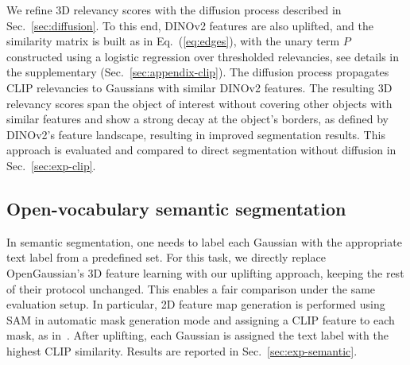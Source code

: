 We refine 3D relevancy scores with the diffusion process described in Sec.~\ref{sec:diffusion}. To this end, DINOv2 features are also uplifted, and the similarity matrix is built as in Eq.~(\ref{eq:edges}), with the unary term $P$ constructed using a logistic regression over thresholded relevancies, see details in the supplementary (Sec.~\ref{sec:appendix-clip}). The diffusion process propagates CLIP relevancies to Gaussians with similar DINOv2 features. The resulting 3D relevancy scores span the object of interest without covering other objects with similar features and show a strong decay at the object's borders, as defined by DINOv2's feature landscape, resulting in improved segmentation results. 
This approach is evaluated and compared to direct segmentation without diffusion in Sec.~\ref{sec:exp-clip}.

\subsection{Open-vocabulary semantic segmentation}
\label{sec:method_semantic}

In semantic segmentation, one needs to label each Gaussian with the appropriate text label from a predefined set.
%
For this task, we directly replace OpenGaussian’s 3D feature learning with our uplifting approach, keeping the rest of their protocol unchanged. This enables a fair comparison under the same evaluation setup.
In particular, 2D feature map generation is performed using SAM in automatic mask generation mode and assigning a CLIP feature to each mask, as in~\citep{qin2023langsplat, shi2024legaussians, wu2024opengaussian}.
After uplifting, each Gaussian is assigned 
the text label with the highest CLIP similarity.
Results are reported in Sec.~\ref{sec:exp-semantic}.